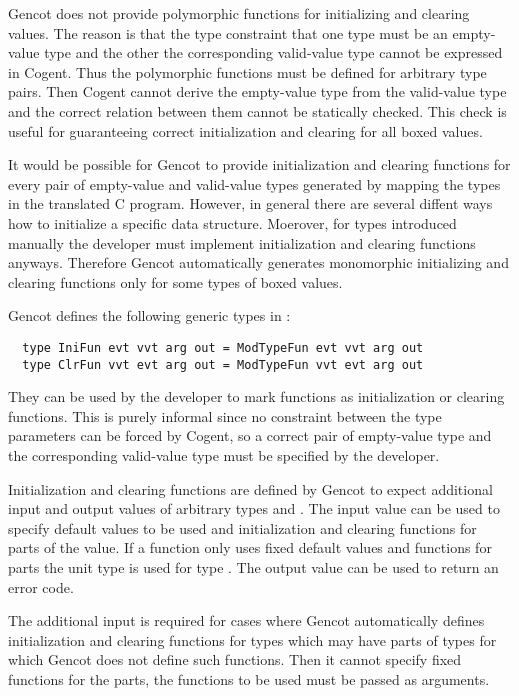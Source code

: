 Gencot does not provide polymorphic functions for initializing and clearing values. The reason is that the type
constraint that one type must be an empty-value type and the other the corresponding valid-value type cannot be
expressed in Cogent. Thus the polymorphic functions must be defined for arbitrary type pairs. Then Cogent cannot 
derive the empty-value type from the valid-value type and the correct relation between them cannot be statically
checked. This check is useful for guaranteeing correct initialization and clearing for all boxed values.

It would be possible for Gencot to provide initialization and clearing functions for every pair of empty-value
and valid-value types generated by mapping the types in the translated C program. However, in general there are 
several diffent ways how to initialize a specific data structure. Moerover, for types introduced manually the developer 
must implement initialization and clearing functions anyways. Therefore Gencot automatically generates
monomorphic initializing and clearing functions only for some types of boxed values.

Gencot defines the following generic types in :
\begin{verbatim}
  type IniFun evt vvt arg out = ModTypeFun evt vvt arg out
  type ClrFun vvt evt arg out = ModTypeFun vvt evt arg out
\end{verbatim}
They can be used by the developer to mark functions as initialization or clearing functions. This is purely 
informal since no constraint between the type parameters can be forced by Cogent, so a correct pair of 
empty-value type and the corresponding valid-value type must be specified by the developer.

Initialization and clearing functions are defined by Gencot to expect additional input and output values of 
arbitrary types  and . The input value can be used to specify default values to be used and initialization and clearing 
functions for parts of the value. If a function only uses fixed default values and functions for parts 
the unit type \code{()} is used for type . The output value can be used to return an error code.

The additional input is required for cases where Gencot automatically defines initialization and clearing
functions for types which may have parts of types for which Gencot does not define such functions. Then 
it cannot specify fixed functions for the parts, the functions to be used must be passed as arguments.

